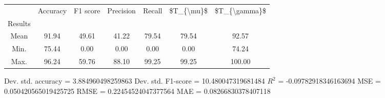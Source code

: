 \begin{tabular}{|c|c|c|c|c|c|c|}
\toprule
{} &  Accuracy &  F1 score &  Precision &  Recall &  \$T\_\{\textbackslash mu\}\$ &  \$T\_\{\textbackslash gamma\}\$ \\
Results &           &           &            &         &            &               \\
\hline
Mean    &     91.94 &     49.61 &      41.22 &   79.54 &      79.54 &         92.57 \\
Min.    &     75.44 &      0.00 &       0.00 &    0.00 &       0.00 &         74.24 \\
Max.    &     96.24 &     59.76 &      88.10 &   99.25 &      99.25 &        100.00 \\
\bottomrule
\end{tabular}

 Dev. std. accuracy = 3.884960498259863
 Dev. std. F1-score = 10.480047319681484
 $R^2$ = -0.09782918346163694
 MSE = 0.050420565019425725
 RMSE = 0.22454524047377564
 MAE = 0.08266830378407118
